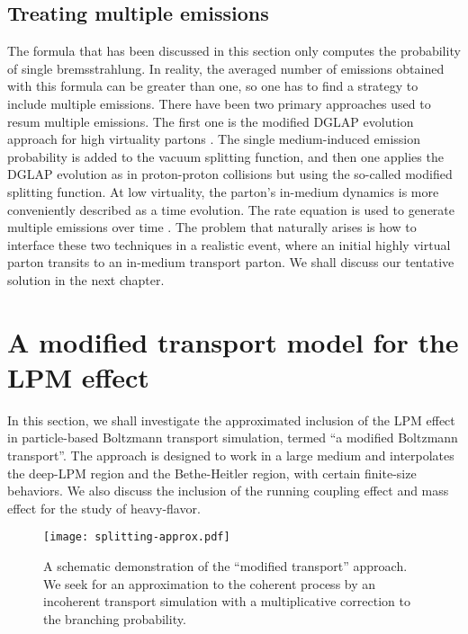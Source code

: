 \subsection{Treating multiple emissions}
The formula that has been discussed in this section only computes the probability of single bremsstrahlung.
In reality, the averaged number of emissions obtained with this formula can be greater than one, so one has to find a strategy to include multiple emissions.
There have been two primary approaches used to resum multiple emissions.
The first one is the modified DGLAP evolution approach for high virtuality partons \cite{Wang:2002pk,Cao:2017qpx}.
The single medium-induced emission probability is added to the vacuum splitting function, and then one applies the DGLAP evolution as in proton-proton collisions but using the so-called modified splitting function.
At low virtuality, the parton's in-medium dynamics is more conveniently described as a time evolution. 
The rate equation is used to generate multiple emissions over time \cite{Arnold:2002zm,Jeon:2003gi,Schenke:2009gb}.
The problem that naturally arises is how to interface these two techniques in a realistic event, where an initial highly virtual parton transits to an in-medium transport parton.
We shall discuss our tentative solution in the next chapter.


\section{A modified transport model for the LPM effect}
\label{section:modified-transport}
In this section, we shall investigate the approximated inclusion of the LPM effect in particle-based Boltzmann transport simulation, termed ``a modified Boltzmann transport''.
The approach is designed to work in a large medium and interpolates the deep-LPM region and the Bethe-Heitler region, with certain finite-size behaviors.
We also discuss the inclusion of the running coupling effect and mass effect for the study of heavy-flavor.

\begin{figure}
\singlespacing
\centering
\texttt{[image: splitting-approx.pdf]}
\caption[A schematic demonstration of the ``modified transport'' approach.]{A schematic demonstration of the ``modified transport'' approach. We seek for an approximation to the coherent process by an incoherent transport simulation with a multiplicative correction to the branching probability.}
\label{fig:split-approx}
\end{figure}
